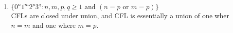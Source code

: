 \documentclass{article}
\begin{document}
\begin{enumerate}[label=\alph*.]
\begin{proof}
Me: $w = 0^{2k}1^{2k}2^{2k}3^{23}$\\
Demon: $w = uvxyz$ where $\lvert uy\rvert \geq 1$ and $\lvert vxy\rvert \leq k$\\
Me: $t = 17$\\
For the same reason as above, $vxy$ cannot span 3 numbers(0,1,2), so any change by pumping will be made to two next to each other(0,1 or 1,2), but not to all three, so if $n = m$, $n \neq p$ and visa versa.
\end{proof}
\item $\{0^n1^m2^p3^q :n,m,p,q \geq 1 \text{ and } (n=p \text{ or } m=p)\}$\\
CFLs are closed under union, and CFL is essentially a union of one wher $n=m$ and one where $m=p$.
\end{enumerate}
\end{document}
